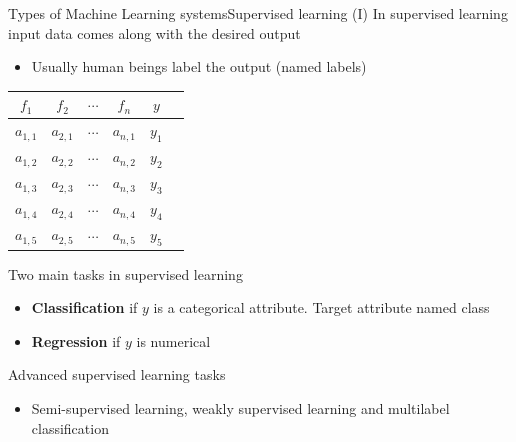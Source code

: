 \documentclass[10pt,compress]{beamer} %
\begin{document}
\begin{frame}[fragile]{Types of Machine Learning systems}{Supervised learning (I)}
	In supervised learning input data comes along with the desired output
	\begin{itemize}
		\item Usually human beings label the output (named \alert{labels})
	\end{itemize}

	\begin{center}
	\begin{tabular}{cccccc}\hline
	 	$f_1$     & $f_2$     & $\cdots$ & $f_n$     & $y$\\\hline
	 	$a_{1,1}$ & $a_{2,1}$ & $\cdots$ & $a_{n,1}$ & $y_1$ \\
	 	$a_{1,2}$ & $a_{2,2}$ & $\cdots$ & $a_{n,2}$ & $y_2$ \\
	 	$a_{1,3}$ & $a_{2,3}$ & $\cdots$ & $a_{n,3}$ & $y_3$ \\
	 	$a_{1,4}$ & $a_{2,4}$ & $\cdots$ & $a_{n,4}$ & $y_4$ \\
	 	$a_{1,5}$ & $a_{2,5}$ & $\cdots$ & $a_{n,5}$ & $y_5$ \\
	 	\hline
	\end{tabular}
	\end{center}

	 Two main tasks in supervised learning
	 \begin{itemize}
	 	\item \textbf{Classification} if $y$ is a categorical attribute. Target attribute named \alert{class}
		\item \textbf{Regression} if $y$ is numerical 
	 \end{itemize}
	 Advanced supervised learning tasks
	\begin{itemize}
	 	\item Semi-supervised learning, weakly supervised learning and multilabel classification
	 \end{itemize}

\end{frame}
\end{document}
